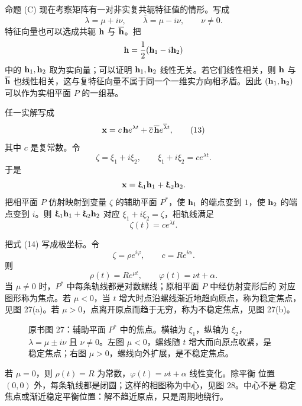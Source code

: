 \begin{sourceitem}{命题 (C)}
现在考察矩阵有一对非实复共轭特征值的情形。写成
\begin{equation}
 \lambda=\mu+i\nu,\qquad
 \overline\lambda=\mu-i\nu,\qquad \nu\neq0.
 \tag{12}
\end{equation}
特征向量也可以选成共轭
\(\vect{h}\) 与 \(\overline{\vect{h}}\)。把
\[
 \vect{h}=\frac12(\vect{h}_1-i\vect{h}_2)
\]
中的 \(\vect{h}_1,\vect{h}_2\) 取为实向量；可以证明 \(\vect{h}_1,\vect{h}_2\) 线性无关。若它们线性相关，则 \(\vect{h}\)
与 \(\overline{\vect{h}}\) 也线性相关，这与复特征向量不属于同一个一维实方向相矛盾。因此
\((\vect{h}_1,\vect{h}_2)\) 可以作为实相平面 \(P\) 的一组基。

任一实解写成
\begin{equation}
 \vect{x}=c\,\vect{h} e^{\lambda t}
  +\overline c\,\overline{\vect{h}} e^{\overline\lambda t},
 \tag{13}
\end{equation}
其中 \(c\) 是复常数。令
\[
 \zeta=\xi_1+i\xi_2,\qquad
 \xi_1+i\xi_2=c e^{\lambda t}.
\]
于是
\[
 \vect{x}=\xi_1\vect{h}_1+\xi_2\vect{h}_2.
\]
把相平面 \(P\) 仿射映射到变量 \(\zeta\) 的辅助平面 \(P^*\)，使 \(\vect{h}_1\) 的端点变到
\(1\)，使 \(\vect{h}_2\) 的端点变到 \(i\)。则 \(\xi_1\vect{h}_1+\xi_2\vect{h}_2\) 对应
\(\xi_1+i\xi_2=\zeta\)，相轨线满足
\begin{equation}
 \zeta(t)=c e^{\lambda t}.
 \tag{14}
\end{equation}

把式 (14) 写成极坐标。令
\[
 \zeta=\rho e^{i\varphi},\qquad
 c=Re^{i\alpha}.
\]
则
\begin{equation}
 \rho(t)=Re^{\mu t},\qquad
 \varphi(t)=\nu t+\alpha.
 \tag{15}
\end{equation}
当 \(\mu\neq0\) 时，\(P^*\) 中每条轨线都是对数螺线；原相平面 \(P\) 中经仿射变形后的
对应图形称为焦点。若 \(\mu<0\)，当 \(t\) 增大时点沿螺线渐近地趋向原点，称为稳定焦点，
见图 27(a)。若 \(\mu>0\)，点离开原点而趋于无穷，称为不稳定焦点，见图 27(b)。

\begin{figure}[H]
 \centering
 
 \caption{原书图 27：辅助平面 \(P^*\) 中的焦点。横轴为 \(\xi_1\)，纵轴为
 \(\xi_2\)，\(\lambda=\mu\pm i\nu\) 且 \(\nu\neq0\)。左图 \(\mu<0\)，螺线随
 \(t\) 增大而向原点收紧，是稳定焦点；右图 \(\mu>0\)，螺线向外扩展，是不稳定焦点。}
 \label{fig:ch2-p2-27}
\end{figure}

若 \(\mu=0\)，则 \(\rho(t)=R\) 为常数，\(\varphi(t)=\nu t+\alpha\) 线性变化。除平衡
位置 \((0,0)\) 外，每条轨线都是闭圆；这样的相图称为中心，见图 28。中心不是
稳定焦点或渐近稳定平衡位置：解不趋近原点，只是周期地绕行。
\end{sourceitem}

